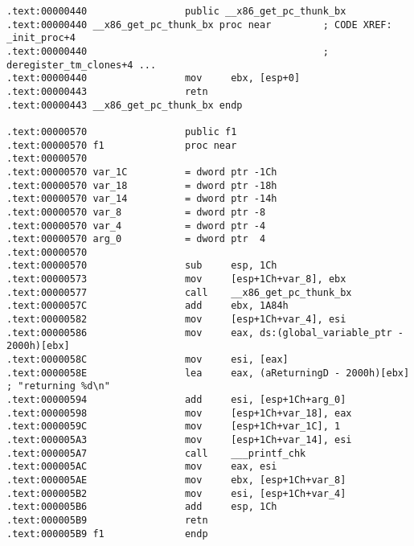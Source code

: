 \begin{lstlisting}[caption=GCC 4.7.3]
.text:00000440                 public __x86_get_pc_thunk_bx
.text:00000440 __x86_get_pc_thunk_bx proc near         ; CODE XREF: _init_proc+4
.text:00000440                                         ; deregister_tm_clones+4 ...
.text:00000440                 mov     ebx, [esp+0]
.text:00000443                 retn
.text:00000443 __x86_get_pc_thunk_bx endp

.text:00000570                 public f1
.text:00000570 f1              proc near
.text:00000570
.text:00000570 var_1C          = dword ptr -1Ch
.text:00000570 var_18          = dword ptr -18h
.text:00000570 var_14          = dword ptr -14h
.text:00000570 var_8           = dword ptr -8
.text:00000570 var_4           = dword ptr -4
.text:00000570 arg_0           = dword ptr  4
.text:00000570
.text:00000570                 sub     esp, 1Ch
.text:00000573                 mov     [esp+1Ch+var_8], ebx
.text:00000577                 call    __x86_get_pc_thunk_bx
.text:0000057C                 add     ebx, 1A84h
.text:00000582                 mov     [esp+1Ch+var_4], esi
.text:00000586                 mov     eax, ds:(global_variable_ptr - 2000h)[ebx]
.text:0000058C                 mov     esi, [eax]
.text:0000058E                 lea     eax, (aReturningD - 2000h)[ebx] ; "returning %d\n"
.text:00000594                 add     esi, [esp+1Ch+arg_0]
.text:00000598                 mov     [esp+1Ch+var_18], eax
.text:0000059C                 mov     [esp+1Ch+var_1C], 1
.text:000005A3                 mov     [esp+1Ch+var_14], esi
.text:000005A7                 call    ___printf_chk
.text:000005AC                 mov     eax, esi
.text:000005AE                 mov     ebx, [esp+1Ch+var_8]
.text:000005B2                 mov     esi, [esp+1Ch+var_4]
.text:000005B6                 add     esp, 1Ch
.text:000005B9                 retn
.text:000005B9 f1              endp
\end{lstlisting}

\newcommand{\retstring}{\IT{<<returning \%d\textbackslash{}n>>}}
\newcommand{\globvar}{\IT{global\_variable}}

